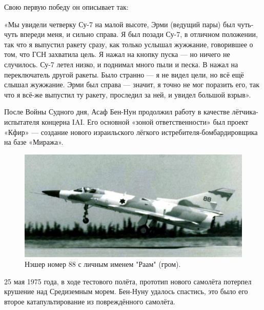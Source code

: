 Свою первую победу он описывает так:

«Мы увидели четверку Су-7 на малой высоте, Эрми (ведущий пары) был чуть-чуть впереди меня, и сильно справа. Я был позади Су-7, в отличном положении, так что я выпустил ракету сразу, как только услышал жужжание, говорившее о том, что ГСН захватила цель. Я нажал на кнопку пуска — но ничего не случилось. Су-7 летел низко, и поднимал много пыли и песка. В нажал на переключатель другой ракеты. Было странно — я не видел цели, но всё ещё слышал жужжание. Эрми был справа — значит, я точно не мог поразить его, так что я всё-же выпустил ту ракету, проследил за ней, и увидел большой взрыв».

После Войны Судного дня, Асаф Бен-Нун продолжил работу в качестве лётчика-испытателя концерна IAI. Его основной «зоной ответственности» был проект «Кфир» — создание нового израильского лёгкого истребителя-бомбардировщика на базе «Миража». 

\begin{figure}[h!tb] 
	\centering\includegraphics[scale=0.8]{History_BenNun/jceZ2lxQ9no.jpg}
	\caption{Нэшер номер 88 с личным именем "Раам" (гром). }
\end{figure}

25 мая 1975 года, в ходе тестового полёта, прототип нового самолёта потерпел крушение над Средиземным морем. Бен-Нуну удалось спастись, это было его второе катапультирование из повреждённого самолёта.

